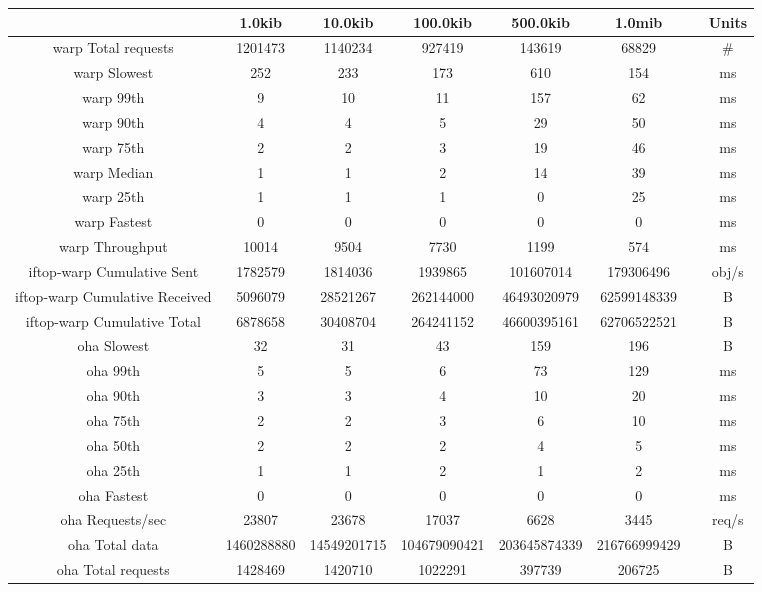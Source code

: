 \begin{sidewaystable}
	\begin{tabular}{|c|c|c|c|c|c|c|c|}
		\hline
		& 1.0kib & 10.0kib & 100.0kib & 500.0kib & 1.0mib &  & Units \\
		\hline
		warp Total requests & 1201473 & 1140234 & 927419 & 143619 & 68829 &  & \# \\
		\hline
		warp Slowest & 252 & 233 & 173 & 610 & 154 &  & ms \\
		\hline
		warp 99th & 9 & 10 & 11 & 157 & 62 &  & ms \\
		\hline
		warp 90th & 4 & 4 & 5 & 29 & 50 &  & ms \\
		\hline
		warp 75th & 2 & 2 & 3 & 19 & 46 &  & ms \\
		\hline
		warp Median & 1 & 1 & 2 & 14 & 39 &  & ms \\
		\hline
		warp 25th & 1 & 1 & 1 & 0 & 25 &  & ms \\
		\hline
		warp Fastest & 0 & 0 & 0 & 0 & 0 &  & ms \\
		\hline
		warp Throughput & 10014 & 9504 & 7730 & 1199 & 574 &  & ms \\
		\hline
		iftop-warp Cumulative Sent & 1782579 & 1814036 & 1939865 & 101607014 & 179306496 &  & obj/s \\
		\hline
		iftop-warp Cumulative Received & 5096079 & 28521267 & 262144000 & 46493020979 & 62599148339 &  & B \\
		\hline
		iftop-warp Cumulative Total & 6878658 & 30408704 & 264241152 & 46600395161 & 62706522521 &  & B \\
		\hline
		oha Slowest & 32 & 31 & 43 & 159 & 196 &  & B \\
		\hline
		oha 99th & 5 & 5 & 6 & 73 & 129 &  & ms \\
		\hline
		oha 90th & 3 & 3 & 4 & 10 & 20 &  & ms \\
		\hline
		oha 75th & 2 & 2 & 3 & 6 & 10 &  & ms \\
		\hline
		oha 50th & 2 & 2 & 2 & 4 & 5 &  & ms \\
		\hline
		oha 25th & 1 & 1 & 2 & 1 & 2 &  & ms \\
		\hline
		oha Fastest & 0 & 0 & 0 & 0 & 0 &  & ms \\
		\hline
		oha Requests/sec & 23807 & 23678 & 17037 & 6628 & 3445 &  & req/s \\
		\hline
		oha Total data & 1460288880 & 14549201715 & 104679090421 & 203645874339 & 216766999429 &  & B \\
		\hline
		oha Total requests & 1428469 & 1420710 & 1022291 & 397739 & 206725 &  & B \\

\end{tabular}
\end{sidewaystable}
